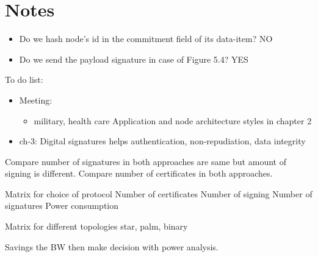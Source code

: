 \chapter{Notes}

\begin{itemize}
	\item Do we hash node's id in the commitment field of its data-item? NO
	\item Do we send the payload signature in case of Figure 5.4? YES
\end{itemize}

To do list:
\begin{itemize}
	\item Meeting: 
	\begin{itemize}
		\item military, health care Application and node architecture styles in chapter 2
	\end{itemize}
	\item ch-3: Digital signatures helps authentication, non-repudiation, data integrity

\end{itemize}
	
	Compare number of signatures in both approaches are same but amount of signing is different.
	Compare number of certificates in both approaches.

	Matrix for choice of protocol
		Number of certificates
		Number of signing
		Number of signatures
		Power consumption

	Matrix for different topologies
		star, palm, binary 
		
	Savings the BW then make decision with power analysis.
